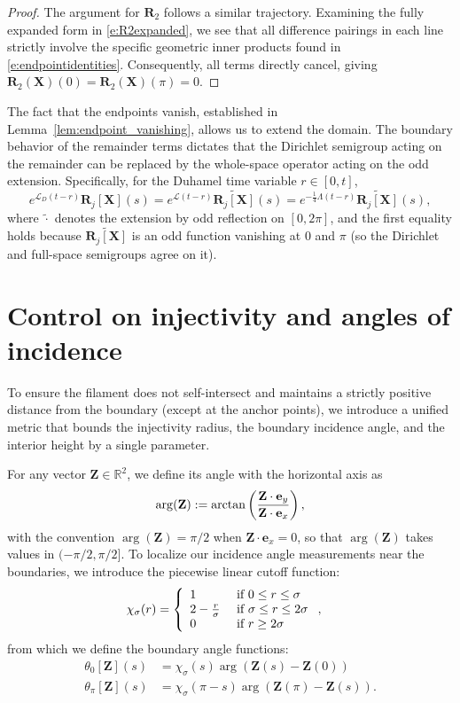 \documentclass{amsart}
\newcommand{\mZ}{\mathbf{Z}}
\newcommand{\R}{\mathbb{R}}
\begin{document}
\begin{proof}
The argument for $\mathbf{R}_2$ follows a similar trajectory. Examining the fully expanded form in \eqref{e:R2expanded}, we see that all difference pairings in each line strictly involve the specific geometric inner products found in \eqref{e:endpointidentities}. Consequently, all terms directly cancel, giving $\mathbf{R}_2(\mathbf{X})(0) = \mathbf{R}_2(\mathbf{X})(\pi) = 0$.
\end{proof}

The fact that the endpoints vanish, established in Lemma~\ref{lem:endpoint_vanishing}, allows us to extend the domain. The boundary behavior of the remainder terms dictates that the Dirichlet semigroup acting on the remainder can be replaced by the whole-space operator acting on the odd extension. Specifically, for the Duhamel time variable $r \in [0,t]$,
\[
e^{\mathcal{L}_D(t-r)} \mathbf{R}_j[\mathbf{X}](s)
= e^{\mathcal{L}(t-r)} \widetilde{\mathbf{R}_j[\mathbf{X}]}(s)
= e^{-\frac{1}{4}\Lambda(t-r)} \widetilde{\mathbf{R}_j[\mathbf{X}]}(s),
\]
where $\widetilde{\cdot}$ denotes the extension by odd reflection on $[0,2\pi]$, and the first equality holds because $\widetilde{\mathbf{R}_j[\mathbf{X}]}$ is an odd function vanishing at $0$ and $\pi$ (so the Dirichlet and full-space semigroups agree on it).

\section{Control on injectivity and angles of incidence}

To ensure the filament does not self-intersect and maintains a strictly positive distance from the boundary (except at the anchor points), we introduce a unified metric that bounds the injectivity radius, the boundary incidence angle, and the interior height by a single parameter.


For any vector $\mZ \in \R^2$, we define its angle with the horizontal axis as
\[
\arg ( \mZ ) := \arctan\left( {\mZ \cdot \mathbf{e}_y \over \mZ \cdot \mathbf{e}_x}\right),
\]
with the convention $\arg(\mZ) = \pi/2$ when $\mZ \cdot \mathbf{e}_x = 0$, so that $\arg(\mZ)$ takes values in $(-\pi/2, \pi/2]$.
To localize our incidence angle measurements near the boundaries, we introduce the piecewise linear cutoff function:
\begin{align*}
\chi_\sigma (r) & = \left\{ \begin{array}{ll} 
1 & \hbox{ if } 0 \leq r \leq \sigma \\
2 - {r\over \sigma} & \hbox{ if } \sigma \leq r \leq 2\sigma \\
0 & \hbox{ if } r \geq 2 \sigma
\end{array} \right. ,
\end{align*}
from which we define the boundary angle functions:
\begin{align*}
\theta_0[\mZ](s) & = \chi_\sigma (s) \arg \left( {\mZ(s) - \mZ(0)} \right)  \\
\theta_\pi[\mZ](s) & = \chi_\sigma (\pi - s) \arg \left( {\mZ(\pi) - \mZ(s)} \right) .
\end{align*}
\end{document}
